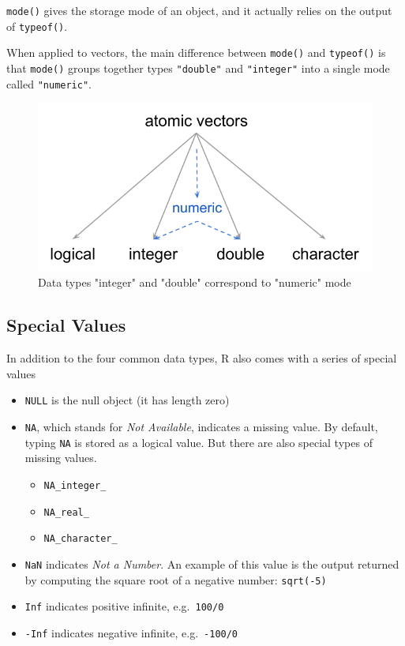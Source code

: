 \documentclass[
]{book}
\providecommand{\tightlist}{%
  \setlength{\itemsep}{0pt}\setlength{\parskip}{0pt}}
\begin{document}
\texttt{mode()} gives the storage mode of an object, and it actually relies on the
output of \texttt{typeof()}.

When applied to vectors, the main difference between \texttt{mode()} and \texttt{typeof()} is
that \texttt{mode()} groups together types \texttt{"double"} and \texttt{"integer"} into a single
mode called \texttt{"numeric"}.

\begin{figure}

{\centering \includegraphics[width=0.55\linewidth]{images/objects/obj-vector-atomic-modes} 

}

\caption{Data types "integer" and "double" correspond to "numeric" mode}\label{fig:unnamed-chunk-48}
\end{figure}

\hypertarget{special-values}{%
\subsection{Special Values}\label{special-values}}

In addition to the four common data types, R also comes with a series of
special values

\begin{itemize}
\item
  \texttt{NULL} is the null object (it has length zero)
\item
  \texttt{NA}, which stands for \emph{Not Available}, indicates a missing value. By default,
  typing \texttt{NA} is stored as a logical value. But there are also special types of
  missing values.

  \begin{itemize}
  \tightlist
  \item
    \texttt{NA\_integer\_}
  \item
    \texttt{NA\_real\_}
  \item
    \texttt{NA\_character\_}
  \end{itemize}
\item
  \texttt{NaN} indicates \emph{Not a Number}. An example of this value is the output
  returned by computing the square root of a negative number: \texttt{sqrt(-5)}
\item
  \texttt{Inf} indicates positive infinite, e.g.~\texttt{100/0}
\item
  \texttt{-Inf} indicates negative infinite, e.g.~\texttt{-100/0}
\end{itemize}
\end{document}
